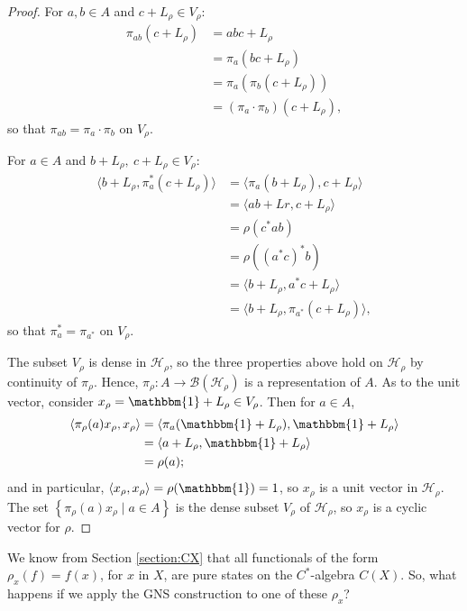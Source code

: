 \documentclass[11pt,a4paper]{report}
\theoremstyle{plain}
\theoremstyle{definition}
\newcommand{\1}{\mathbbm{1}}
\newcommand{\B}{\mathcal{B}}
\newcommand{\Hr}{\mathcal{H}_\rho}
\newcommand{\Vr}{V_\rho}
\newcommand{\Lr}{L_\rho}
\newcommand{\xr}{x_\rho}
\newcommand{\CX}{C(X)}
\begin{document}
\begin{proof}
	For $a,b \in A$ and $c+ L_\rho \in \Vr$:
	\begin{align*}
		\pi_{ab}(c+\Lr)
		&=		abc+\Lr																	\\
		&=		\pi_a (bc+\Lr)															\\
		&=		\pi_a (\pi_b (c+\Lr))													\\
		&=		(\pi_a \cdot \pi_b) (c+\Lr),
	\end{align*}
	so that $\pi_{a b} = \pi_a \cdot \pi_b$ on $\Vr$.
	
	For $a\in A$ and $b+ L_\rho,~c+ L_\rho \in \Vr$:
	\begin{align*}
				\langle b+\Lr, \pi_a^\ast (c+\Lr) \rangle 
		&=		\langle \pi_a (b+\Lr), c+\Lr \rangle									\\
		&=		\langle ab +Lr, c+\Lr \rangle											\\
		&=		\rho(c^\ast ab)															\\
		&=		\rho((a^\ast c)^\ast b)													\\
		&=		\langle b+\Lr, a^\ast c+\Lr \rangle										\\
		&=		\langle b+\Lr, \pi_{a^\ast}(c+\Lr)\rangle,
	\end{align*}
	so that $ \pi_a^\ast = \pi_{a^\ast}$ on $\Vr$.
	
	The subset $\Vr$ is dense in $\Hr$, so the three properties above hold on $\Hr$ 
	by continuity of $\pi_\rho$. Hence, $\pi_\rho: A \to \B(\Hr)$ is a 
	representation of $A$. As to the unit vector, consider $\xr = \1 + \Lr \in \Vr$. 
	Then for $a \in A$,
	\begin{align*}
				\langle \pi_\rho(a)\xr ,\xr \rangle 
		&=		\langle \pi_a(\1+\Lr), \1+\Lr \rangle									\\
		&=		\langle a+\Lr, \1+\Lr \rangle											\\
		&=		\rho(a);
	\end{align*}
	and in particular, $\langle \xr,\xr \rangle = \rho (\1) = 1$, so $\xr$ is a unit 
	vector in $\Hr$. The set $\left\{\pi_\rho(a)x_\rho \mid a\in A\right\}$ is the 
	dense subset $\Vr$ of $\Hr$, so $x_\rho$ is a cyclic vector for $\rho$.


\end{proof}

We know from Section \ref{section:CX} that all functionals of the form 
$\rho_x(f) = f(x)$, for $x$ in $X$, are pure states on the $C^\ast$-algebra 
$\CX$. So, what happens if we apply the GNS construction to one of these 
$\rho_x$?
\end{document}
